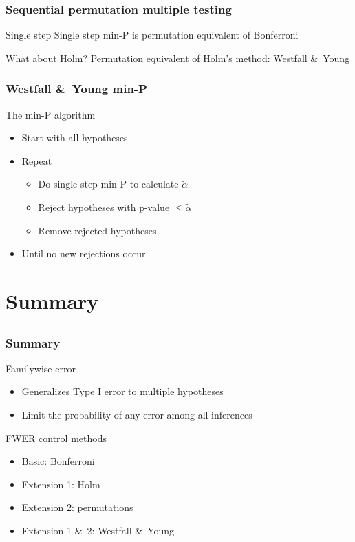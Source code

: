 \documentclass[compress]{beamer}
\newcommand{\bb}[1]{\begin{block}{#1}}
\newcommand{\eb}{\end{block}}
\newcommand{\bi}{\begin {itemize}}
\newcommand{\ei}{\end{itemize}}
\newcommand{\bfr}[1]{\begin{frame} \frametitle{#1}}
\begin{document}
\bfr{Sequential permutation multiple testing}
  \bb{Single step}
    Single step min-P is permutation equivalent of Bonferroni
  \eb
  \bb{What about Holm?}
    Permutation equivalent of Holm's method: Westfall \&\ Young
  \eb
\end{frame}



\bfr{Westfall \&\ Young min-P}
  \bb{The min-P algorithm}
    \bi
      \item Start with all hypotheses
      \item Repeat
      \bi
      \item Do single step min-P to calculate $\tilde\alpha$
      \item Reject hypotheses with p-value $\leq \tilde\alpha$
      \item Remove rejected hypotheses
      \ei
      \item Until no new rejections occur
    \ei
  \eb
\end{frame}


\section{Summary}
\subsection{}

\bfr{Summary}
  \bb{Familywise error}
    \bi
      \item Generalizes Type I error to multiple hypotheses
      \item Limit the probability of any error among all inferences
    \ei
  \eb
  \bb{FWER control methods}
    \bi
      \item Basic: Bonferroni
      \item Extension 1: Holm
      \item Extension 2: permutations
      \item Extension 1 \&\ 2: Westfall \&\ Young
    \ei
  \eb
\end{frame}
\end{document}
